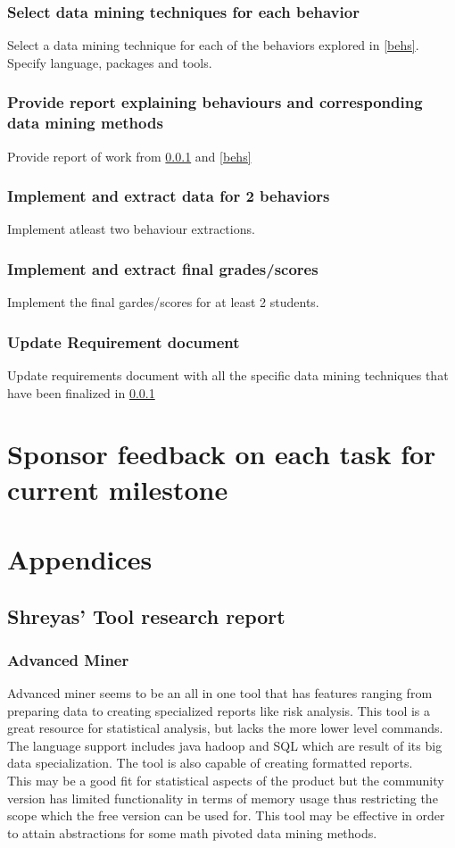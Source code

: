 \documentclass[12pt]{article}
\begin{document}
	\subsubsection{Select data mining techniques for each behavior} \label{techs}
	Select a data mining technique for each of the behaviors explored in \ref{behs}. Specify language, packages and tools.
	\subsubsection{Provide report explaining behaviours and corresponding data mining methods}
	Provide report of work from \ref{techs} and \ref{behs}
	\subsubsection{Implement and extract data for 2 behaviors}
	Implement atleast two behaviour extractions.
	\subsubsection{Implement and extract final grades/scores}
	Implement the final gardes/scores for at least 2 students.
	\subsubsection{Update Requirement document}
	Update requirements document with all the specific data mining techniques that have been finalized in \ref{techs}
	\pagebreak
	\section{Sponsor feedback on each task for current milestone}
	\pagebreak
	\section{Appendices}
	\subsection{Shreyas' Tool research report} \label{app_shr}
	\subsubsection{Advanced Miner} \label{adv}
	Advanced miner seems to be an all in one tool that has features ranging from preparing data to creating specialized reports like risk analysis. This tool is a great resource for statistical analysis, but lacks the more lower level commands. \\
	The language support includes java hadoop and SQL which are result of its big data specialization. The tool is also capable of creating formatted reports.\\
	This may be a good fit for statistical aspects of the product but the community version has limited functionality in terms of memory usage thus restricting the scope which the free version can be used for. This tool may be effective in order to attain abstractions for some math pivoted data mining methods.
\end{document}
